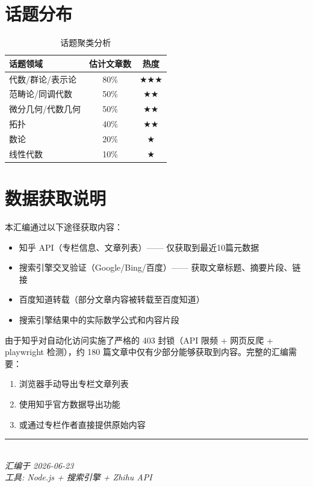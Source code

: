 \documentclass[10pt, openany]{book}
\begin{document}
\section{话题分布}

\begin{table}[ht]
\centering
\begin{tabular}{lcc}
\toprule
\textbf{话题领域} & \textbf{估计文章数} & \textbf{热度} \\
\midrule
代数/群论/表示论 & 80\% & $\bigstar\bigstar\bigstar$ \\
范畴论/同调代数 & 50\% & $\bigstar\bigstar$ \\
微分几何/代数几何 & 50\% & $\bigstar\bigstar$ \\
拓扑 & 40\% & $\bigstar\bigstar$ \\
数论 & 20\% & $\bigstar$ \\
线性代数 & 10\% & $\bigstar$ \\
\bottomrule
\end{tabular}
\caption{话题聚类分析}
\end{table}

\section{数据获取说明}

本汇编通过以下途径获取内容：
\begin{itemize}
    \item 知乎 API（专栏信息、文章列表）—— 仅获取到最近10篇元数据
    \item 搜索引擎交叉验证（Google/Bing/百度）—— 获取文章标题、摘要片段、链接
    \item 百度知道转载（部分文章内容被转载至百度知道）
    \item 搜索引擎结果中的实际数学公式和内容片段
\end{itemize}

由于知乎对自动化访问实施了严格的 403 封锁（API 限频 + 网页反爬 + playwright 检测），约 180 篇文章中仅有少部分能够获取到内容。完整的汇编需要：
\begin{enumerate}
    \item 浏览器手动导出专栏文章列表
    \item 使用知乎官方数据导出功能
    \item 或通过专栏作者直接提供原始内容
\end{enumerate}

\begin{center}
\rule{0.5\textwidth}{0.4pt}\\[6pt]
\textit{汇编于 2026-06-23}\\[3pt]
\textit{工具: Node.js + 搜索引擎 + Zhihu API}
\end{center}
\end{document}
